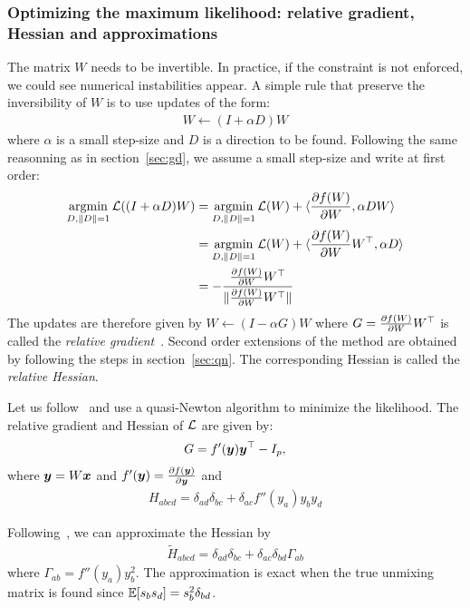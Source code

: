 \subsubsection{Optimizing the maximum likelihood: relative gradient, Hessian and approximations}
\label{sec:opt:likelihood:relativegradient}
The matrix $W$ needs to be invertible. In practice, if the constraint is not
enforced, we could see numerical instabilities appear.
A simple rule that preserve the inversibility of $W$ is to use updates of the
form:
\begin{align}
  W \leftarrow (I + \alpha D)W \label{eq:mult:update}
\end{align}
where $\alpha$ is a small step-size and $D$ is a direction to be found.
Following the same reasonning as in section~\ref{sec:gd}, we assume a small step-size
and write at first order:
\begin{align}
  \argmin_{D, \|D\|=1} \loss((I + \alpha D)W) &= \argmin_{D, \|D\|=1} \loss(W) + \dotp{ \partialfrac{W}{f(W)} }{ \alpha D W } \\
                                              &= \argmin_{D, \|D\|=1} \loss(W) + \dotp{ \partialfrac{W}{f(W)} W^{\top} }{ \alpha D } \\
                                              &= -\frac{\partialfrac{W}{f(W)} W^{\top}}{\|\partialfrac{W}{f(W)} W^{\top} \|}
\end{align}
The updates are therefore given by  $W \leftarrow (I - \alpha G)W$ where $G = \partialfrac{W}{f(W)}
  W^{\top}$ is called the \emph{relative
  gradient}~\cite{cardoso1996equivariant}.
Second order extensions of the method are obtained by following the steps in
section~\ref{sec:qn}. The corresponding Hessian is called the \emph{relative
  Hessian}.


Let us follow~\cite{ablin2018faster} and use a quasi-Newton algorithm to minimize the likelihood.
The relative gradient and Hessian of $\loss$ are given by:
\begin{align}
  G = f'(\yb) \yb^{\top} - I_p,
\end{align}
where $\yb = W \xb$ and $f'(\yb) = \partialfrac{\yb}{f(\yb)}$ 
and
\begin{align}
  H_{abcd} =  \delta_{ad}\delta_{bc} + \delta_{ac} f''(y_a)y_by_d
\end{align}

Following~\cite{ablin2018faster}, we can approximate the Hessian by
\begin{align}
  \tilde{H}_{abcd} = \delta_{ad} \delta_{bc} + \delta_{ac} \delta_{bd} \Gamma_{ab}
\end{align}
where $\Gamma_{ab} = f''(y_a) y_b^2$.
The approximation is exact when the true unmixing matrix is found since $\EE[s_b s_d] =  s_b^2\delta_{bd}$.

